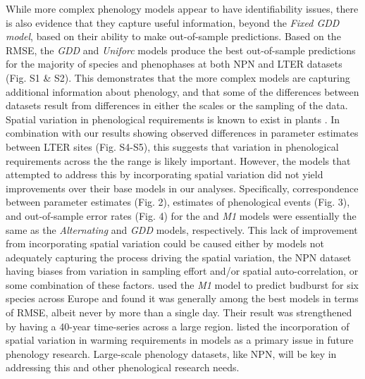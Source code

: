\documentclass[fleqn,12pt,lineno]{article}
\begin{document}
While more complex phenology models appear to have identifiability issues, there is also evidence that they capture useful information, beyond the \textit{Fixed GDD model}, based on their ability to make out-of-sample predictions. Based on the RMSE, the \textit{GDD} and \textit{Uniforc} models produce the best out-of-sample predictions for the majority of species and phenophases at both NPN and LTER datasets (Fig. S1 \& S2). This demonstrates that the more complex models are capturing additional information about phenology, and that some of the differences between datasets result from differences in either the scales or the sampling of the data. Spatial variation in phenological requirements is known to exist in plants \citep{zhang2017}. In combination with our results showing observed differences in parameter estimates between LTER sites (Fig. S4-S5), this suggests that variation in phenological requirements across the the range is likely important. However, the models that attempted to address this by incorporating spatial variation did not yield improvements over their base models in our analyses. Specifically, correspondence between parameter estimates (Fig. 2), estimates of phenological events (Fig. 3), and out-of-sample error rates (Fig. 4) for the  and \textit{M1} models were essentially the same as the \textit{Alternating} and \textit{GDD} models, respectively. This lack of improvement from incorporating spatial variation could be caused either by models not adequately capturing the process driving the spatial variation, the NPN dataset having biases from variation in sampling effort and/or spatial auto-correlation, or some combination of these factors. \cite{basler2016} used the \textit{M1} model to predict budburst for six species across Europe and found it was generally among the best models in terms of RMSE, albeit never by more than a single day. Their result was strengthened by having a 40-year time-series across a large region. \cite{chuine2017} listed the incorporation of spatial variation in warming requirements in models as a primary issue in future phenology research. Large-scale phenology datasets, like NPN, will be key in addressing this and other phenological research needs.
\end{document}
